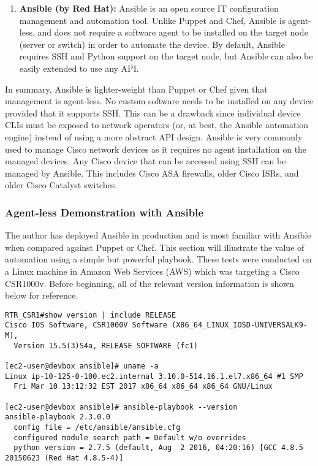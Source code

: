 \begin{enumerate}
  \item \textbf{Ansible (by Red Hat):} Ansible is an open source IT
  configuration management and automation tool. Unlike Puppet and Chef,
  Ansible is agent-less, and does not require a software agent to be installed
  on the target node (server or switch) in order to automate the device. By
  default, Ansible requires SSH and Python support on the target node, but
  Ansible can also be easily extended to use any API.
\end{enumerate}

In summary, Ansible is lighter-weight than Puppet or Chef given that
management is agent-less. No custom software needs to be installed on any
device provided that it supports SSH. This can be a drawback since individual
device CLIs must be exposed to network operators (or, at best, the Ansible
automation engine) instead of using a more abstract API design. Ansible is
very commonly used to manage Cisco network devices as it requires no agent
installation on the managed devices. Any Cisco device that can be accessed
using SSH can be managed by Ansible. This includes Cisco ASA firewalls, older
Cisco ISRs, and older Cisco Catalyst switches.

\subsubsection{Agent-less Demonstration with Ansible}
The author has deployed Ansible in production and is most familiar with
Ansible when compared against Puppet or Chef. This section will illustrate the
value of automation using a simple but powerful playbook. These tests were
conducted on a Linux machine in Amazon Web Services (AWS) which was targeting
a Cisco CSR1000v. Before beginning, all of the relevant version information is
shown below for reference.

\begin{verbatim}
RTR_CSR1#show version | include RELEASE  
Cisco IOS Software, CSR1000V Software (X86_64_LINUX_IOSD-UNIVERSALK9-M),
  Version 15.5(3)S4a, RELEASE SOFTWARE (fc1)

[ec2-user@devbox ansible]# uname -a
Linux ip-10-125-0-100.ec2.internal 3.10.0-514.16.1.el7.x86_64 #1 SMP
  Fri Mar 10 13:12:32 EST 2017 x86_64 x86_64 x86_64 GNU/Linux

[ec2-user@devbox ansible]# ansible-playbook --version
ansible-playbook 2.3.0.0
  config file = /etc/ansible/ansible.cfg
  configured module search path = Default w/o overrides
  python version = 2.7.5 (default, Aug  2 2016, 04:20:16) [GCC 4.8.5 20150623 (Red Hat 4.8.5-4)]
\end{verbatim}

